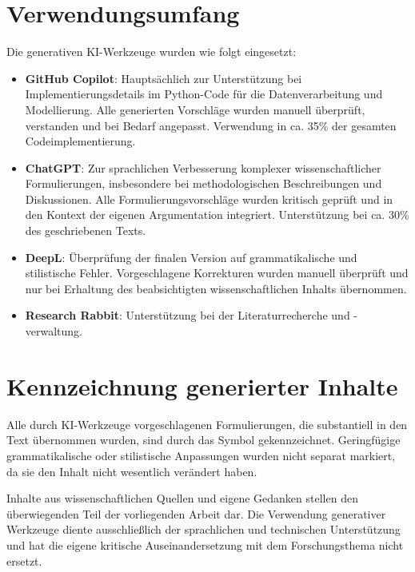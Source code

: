 \section*{Verwendungsumfang}

Die generativen KI-Werkzeuge wurden wie folgt eingesetzt:

\begin{itemize}
  \item \textbf{GitHub Copilot}: Hauptsächlich zur Unterstützung bei Implementierungsdetails im Python-Code für die Datenverarbeitung und Modellierung. Alle generierten Vorschläge wurden manuell überprüft, verstanden und bei Bedarf angepasst. Verwendung in ca. 35\% der gesamten Codeimplementierung.

  \item \textbf{ChatGPT}: Zur sprachlichen Verbesserung komplexer wissenschaftlicher Formulierungen, insbesondere bei methodologischen Beschreibungen und Diskussionen. Alle Formulierungsvorschläge wurden kritisch geprüft und in den Kontext der eigenen Argumentation integriert. Unterstützung bei ca. 30\% des geschriebenen Texts.

  \item \textbf{DeepL}: Überprüfung der finalen Version auf grammatikalische und stilistische Fehler. Vorgeschlagene Korrekturen wurden manuell überprüft und nur bei Erhaltung des beabsichtigten wissenschaftlichen Inhalts übernommen.
  \item \textbf{Research Rabbit}: Unterstützung bei der Literaturrecherche und -verwaltung.
\end{itemize}

\section*{Kennzeichnung generierter Inhalte}

Alle durch KI-Werkzeuge vorgeschlagenen Formulierungen, die substantiell in den Text übernommen wurden, sind durch das Symbol  gekennzeichnet. Geringfügige grammatikalische oder stilistische Anpassungen wurden nicht separat markiert, da sie den Inhalt nicht wesentlich verändert haben.

Inhalte aus wissenschaftlichen Quellen und eigene Gedanken stellen den überwiegenden Teil der vorliegenden Arbeit dar. Die Verwendung generativer Werkzeuge diente ausschließlich der sprachlichen und technischen Unterstützung und hat die eigene kritische Auseinandersetzung mit dem Forschungsthema nicht ersetzt.
